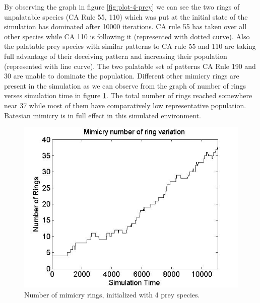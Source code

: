 \documentclass[letterpaper]{article}
\numberwithin{equation}{section}
\begin{document}
By observing the graph in figure \ref{fig:plot-4-prey} we can see the two rings of unpalatable species (CA Rule 55, 110) which was put at the initial state of the simulation has dominated after 10000 iterations. CA rule 55 has taken over all other species while CA 110 is following it (represented with dotted curve). Also the palatable prey species with similar patterns to CA rule 55 and 110 are taking full advantage of their deceiving pattern and increasing their population (represented with line curve). The two palatable set of patterns CA Rule 190 and 30 are unable to dominate the population. Different other mimicry rings are present in the simulation as we can observe from the graph of number of rings verses simulation time in figure \ref{fig:ringSize10k-4Prey}. The total number of rings reached somewhere near 37 while most of them have comparatively low representative population. Batesian mimicry is in full effect in this simulated environment.

\begin{figure}[H]
	\centering
	\includegraphics[scale=0.50]{../tex/images/ringSize10k-4Prey}
	\caption[Number of mimicry rings (4 prey species)]{Number of mimicry rings, initialized with 4 prey species.}
	\label{fig:ringSize10k-4Prey}
\end{figure}
\end{document}

